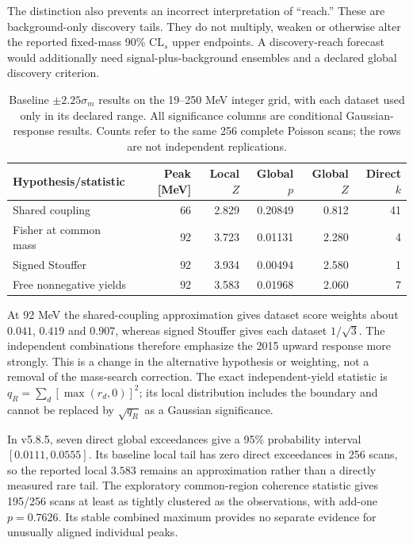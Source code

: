 The distinction also prevents an incorrect interpretation of ``reach.'' These are background-only discovery tails. They do not multiply, weaken or otherwise alter the reported fixed-mass 90\% $\mathrm{CL}_s$ upper endpoints. A discovery-reach forecast would additionally need signal-plus-background ensembles and a declared global discovery criterion.

\begin{table}[htbp]\centering\small
\setlength{\tabcolsep}{4pt}
\begin{tabular}{lrrrrr}\toprule
Hypothesis/statistic & Peak [MeV] & Local $Z$ & Global $p$ & Global $Z$ & Direct $k$\\\midrule
Shared coupling & 66 & 2.829 & 0.20849 & 0.812 & 41\\
Fisher at common mass & 92 & 3.723 & 0.01131 & 2.280 & 4\\
Signed Stouffer & 92 & 3.934 & 0.00494 & 2.580 & 1\\
Free nonnegative yields & 92 & 3.583 & 0.01968 & 2.060 & 7\\\bottomrule
\end{tabular}
\caption{Baseline $\pm2.25\sigma_m$ results on the 19--250 MeV integer grid, with each dataset used only in its declared range. All significance columns are conditional Gaussian-response results. Counts refer to the same 256 complete Poisson scans; the rows are not independent replications.}
\label{tab:history_methods}
\end{table}

At 92 MeV the shared-coupling approximation gives dataset score weights about $0.041$, $0.419$ and $0.907$, whereas signed Stouffer gives each dataset $1/\sqrt3$. The independent combinations therefore emphasize the 2015 upward response more strongly. This is a change in the alternative hypothesis or weighting, not a removal of the mass-search correction. The exact independent-yield statistic is $q_R=\sum_d[\max(r_d,0)]^2$; its local distribution includes the boundary and cannot be replaced by $\sqrt{q_R}$ as a Gaussian significance.

In v5.8.5, seven direct global exceedances give a 95\% probability interval $[0.0111,0.0555]$. Its baseline local tail has zero direct exceedances in 256 scans, so the reported local $3.583$ remains an approximation rather than a directly measured rare tail. The exploratory common-region coherence statistic gives 195/256 scans at least as tightly clustered as the observations, with add-one $p=0.7626$. Its stable combined maximum provides no separate evidence for unusually aligned individual peaks.

